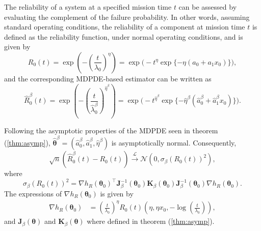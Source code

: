 \documentclass{article}
\begin{document}
The reliability of a system at a specified mission time $t$ can be assessed by evaluating the complement of the failure probability. In other words, assuming standard operating conditions, the reliability of a component at mission time $t$ is defined as the reliability function, under normal operating conditions, and is given by
\begin{equation}
R_0(t)=\exp\left(-\left(\frac{t}{\lambda_0}\right)^{\eta}\right)
=\exp\big(-t^{\eta}\exp\{-\eta(a_0+a_1x_0)\}\big),  \nonumber
\end{equation}
and the corresponding MDPDE-based estimator can be written as
\begin{equation}
\widehat{R}_0^{\beta}(t)
=\exp\left(-\left(\frac{t}{\widehat{\lambda}^{\beta}_0}\right)^{\widehat{\eta}^{\beta}}\right)
=\exp\big(-t^{\widehat{\eta}^{\beta}}\exp\{-\widehat{\eta}^{\beta}(\widehat{a}_0^{\beta}+\widehat{a}_1^{\beta}x_0)\}\big).  \nonumber
\end{equation}

Following the asymptotic properties of the MDPDE seen in theorem (\ref{thm:asymp}),
$\widehat{\boldsymbol{\theta}}^{\beta}=(\widehat{a}_0^{\beta},\widehat{a}_1^{\beta},\widehat{\eta}^{\beta})$
is asymptotically normal. Consequently,
\begin{equation}
\sqrt{n}\left(\widehat{R}_0^{\beta}(t)-R_0(t)\right)
\overset{\mathscr{L}}{\longrightarrow}
\mathcal{N}\left(0,\sigma_{\beta}(R_0(t))^2\right),  \nonumber
\end{equation}
where
\begin{equation}
\sigma_{\beta}(R_0(t))^2
=\nabla h_R(\boldsymbol{\theta}_0)^{\top}
\boldsymbol{J}^{-1}_{\beta}(\boldsymbol{\theta}_0)
\boldsymbol{K}_{\beta}(\boldsymbol{\theta}_0)
\boldsymbol{J}^{-1}_{\beta}(\boldsymbol{\theta}_0)
\nabla h_R(\boldsymbol{\theta}_0).  \nonumber
\end{equation}
The expressions of $\nabla h_R(\boldsymbol{\theta}_0)$ is given by
\begin{align*}
\nabla h_R(\boldsymbol{\theta}_0)&=\left(\frac{t}{\lambda_0}\right)^{\eta}R_0(t)\left(\eta,\eta x_0,-\log\left(\frac{t}{\lambda_0}\right)\right),  \nonumber
\end{align*}
and $\boldsymbol{J}_{\beta}(\boldsymbol{\theta})$ and $\boldsymbol{K}_{\beta}(\boldsymbol{\theta})$ where defined in theorem (\ref{thm:asymp}).
\end{document}

